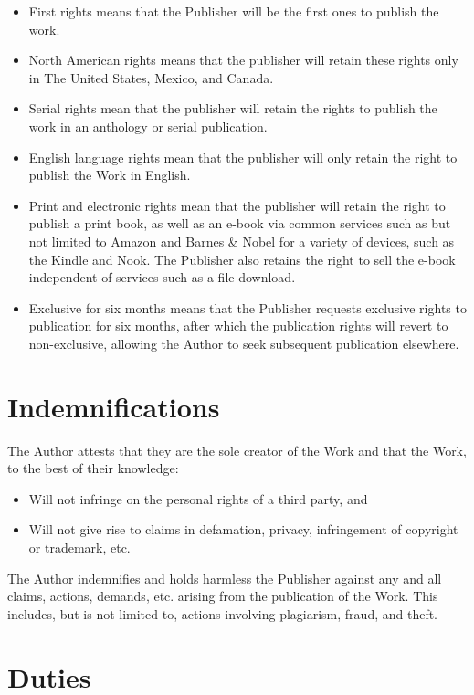 \documentclass[12pt,letterpaper,oneside]{article}
\begin{document}
\begin{itemize}
    \item First rights means that the Publisher will be the first ones to publish the work.
    \item North American rights means that the publisher will retain these rights only in The United States, Mexico, and Canada.
    \item Serial rights mean that the publisher will retain the rights to publish the work in an anthology or serial publication.
    \item English language rights mean that the publisher will only retain the right to publish the Work in English.
    \item Print and electronic rights mean that the publisher will retain the right to publish a print book, as well as an e-book via common services such as but not limited to Amazon and Barnes \& Nobel for a variety of devices, such as the Kindle and Nook. The Publisher also retains the right to sell the e-book independent of services such as a file download.
    \item Exclusive for six months means that the Publisher requests exclusive rights to publication for six months, after which the publication rights will revert to non-exclusive, allowing the Author to seek subsequent publication elsewhere.
\end{itemize}

\section{Indemnifications}

The Author attests that they are the sole creator of the Work and that the Work, to the best of their knowledge:

\begin{itemize}
    \item Will not infringe on the personal rights of a third party, and
    \item Will not give rise to claims in defamation, privacy, infringement of copyright or trademark, etc.
\end{itemize}

The Author indemnifies and holds harmless the Publisher against any and all claims, actions, demands, etc. arising from the publication of the Work. This includes, but is not limited to, actions involving plagiarism, fraud, and theft.

\section{Duties}
\end{document}
